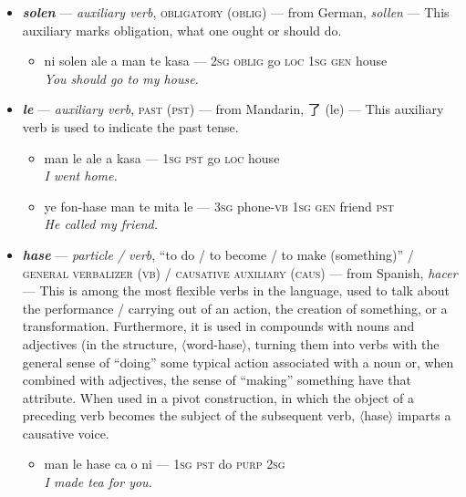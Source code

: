 \documentclass[a4paper]{article}
\begin{document}
\begin{itemize}
	\begin{itemize}
		\item metisin ma pei tewa a ni pa ye — medicine \textsc{int pv} give \textsc{loc 2sg instr 3sg} \\\textit{Was the medicine given to you by her?}
	\end{itemize}
	\item \textbf{\textit{solen}} — \textit{auxiliary verb}, \textsc{obligatory (oblig)} — from German, \textit{sollen} — This auxiliary marks obligation, what one ought or should do.
	\begin{itemize}
		\item ni solen ale a man te kasa — \textsc{2sg oblig} go \textsc{loc 1sg gen} house \\\textit{You should go to my house.}
	\end{itemize}
	\item \textbf{\textit{le}} — \textit{auxiliary verb}, \textsc{past (pst)} — from Mandarin, 了 (le) — This auxiliary verb is used to indicate the past tense.
	\begin{itemize}
		\item man le ale a kasa — \textsc{1sg pst} go \textsc{loc} house  \\\textit{I went home.}
		\item ye fon-hase man te mita le — \textsc{3sg} phone-\textsc{vb 1sg gen} friend \textsc{pst} \\\textit{He called my friend.}
	\end{itemize}
	\item \textbf{\textit{hase}} — \textit{particle / verb}, ``to do / to become / to make (something)'' / \textsc{general verbalizer (vb) / causative auxiliary (caus)} — from Spanish, \textit{hacer} — This is among the most flexible verbs in the language, used to talk about the performance / carrying out of an action, the creation of something, or a transformation. Furthermore, it is used in compounds with nouns and adjectives (in the structure, $\langle$word-hase$\rangle$, turning them into verbs with the general sense of ``doing'' some typical action associated with a noun or, when combined with adjectives, the sense of ``making'' something have that attribute. When used in a pivot construction, in which the object of a preceding verb becomes the subject of the subsequent verb, $\langle$hase$\rangle$ imparts a causative voice.
	\begin{itemize}
		\item man le hase ca o ni — \textsc{1sg pst} do \textsc{purp 2sg} \\\textit{I made tea for you.}

\end{itemize}
\end{itemize}
\end{document}
